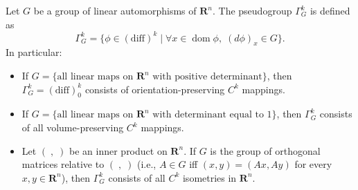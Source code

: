 Let $G$ be a group of linear automorphisms of $\mathbf{R}^n$. The pseudogroup $\Gamma_G^k$ is defined as
$$\Gamma_G^k = \{\phi \in (\mathrm{diff})^k \mid \forall x \in \operatorname{dom} \phi,\; (d\phi)_x \in G\}.$$
In particular:
\begin{itemize}
\item[(i)] If $G = \{\text{all linear maps on } \mathbf{R}^n \text{ with positive determinant}\}$, then $\Gamma_G^k = (\mathrm{diff})_0^k$ consists of orientation-preserving $C^k$ mappings.
\item[(ii)] If $G = \{\text{all linear maps on } \mathbf{R}^n \text{ with determinant equal to } 1\}$, then $\Gamma_G^k$ consists of all volume-preserving $C^k$ mappings.
\item[(iii)] Let $(\;,\;)$ be an inner product on $\mathbf{R}^n$. If $G$ is the group of orthogonal matrices relative to $(\;,\;)$ (i.e., $A \in G$ iff $(x,y) = (Ax, Ay)$ for every $x,y \in \mathbf{R}^n$), then $\Gamma_G^k$ consists of all $C^k$ isometries in $\mathbf{R}^n$.
\end{itemize}
